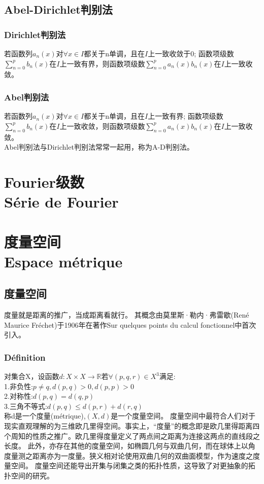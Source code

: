 \documentclass[12pt, a4paper, oneside]{ctexbook}
\begin{document}
\section{Abel-Dirichlet判别法}
  \subsection{Dirichlet判别法}
  若函数列$a_n(x)$对$\forall x \in I$都关于n单调，且在$I$上一致收敛于0;
  函数项级数$\sum_{n=0}^{p}b_n(x)$在$I$上一致有界，则函数项级数$\sum_{n=0}^{p}a_n(x)b_n(x)$在$I$上一致收敛。
  \subsection{Abel判别法}
  若函数列$a_n(x)$对$\forall x \in I$都关于n单调，且在$I$上一致有界;
  函数项级数$\sum_{n=0}^{p}b_n(x)$在$I$上一致收敛，则函数项级数$\sum_{n=0}^{p}a_n(x)b_n(x)$在$I$上一致收敛。\\
  
  Abel判别法与Dirichlet判别法常常一起用，称为A-D判别法。
  

  \chapter{Fourier级数\\Série de Fourier}

\chapter{度量空间\\Espace métrique}
\section{度量空间}
  度量就是距离的推广，当成距离看就行。
  其概念由莫里斯·勒内·弗雷歇(René Maurice Fréchet)于1906年在著作Sur quelques points du calcul fonctionnel中首次引入。
  \subsection{Définition}
  对集合X，设函数$d:X\times X\rightarrow \mathbb{R}$若$\forall(p,q,r)\in X^3$满足:\\
  1.非负性:$p\neq q,d(p,q)>0,d(p,p)>0$\\
  2.对称性:$d(p,q)=d(q,p)$\\
  3.三角不等式:$d(p,q)\leq d(p,r)+d(r,q)$\\
  称d是一个度量(métrique),$(X,d)$是一个度量空间。
  度量空间中最符合人们对于现实直观理解的为三维欧几里得空间。事实上，“度量”的概念即是欧几里得距离四个周知的性质之推广。欧几里得度量定义了两点间之距离为连接这两点的直线段之长度。
  此外，亦存在其他的度量空间，如椭圆几何与双曲几何，而在球体上以角度量测之距离亦为一度量。狭义相对论使用双曲几何的双曲面模型，作为速度之度量空间。
  度量空间还能导出开集与闭集之类的拓扑性质，这导致了对更抽象的拓扑空间的研究。
                 
\end{document}
